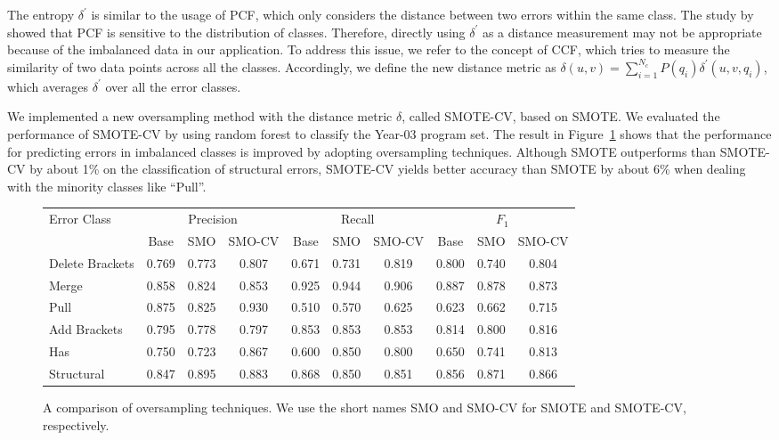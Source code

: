 \documentclass[12pt]{report}	%
\begin{document}
The entropy $\delta^{'}$
is similar to the usage of PCF, which
only considers the distance between two
errors within the same class.
The study by \cite{Mohri94anoptimal} showed that PCF is sensitive
to the distribution of classes.
Therefore, directly using $\delta^{'}$
as a distance measurement may not be appropriate
because of the imbalanced data in our application.
To address this issue, we
refer to the concept of CCF, which
tries to measure the similarity of two data points
across all the classes. Accordingly, we define
the new distance metric as
$\delta(u, v) = \sum_{i=1}^{N_{c}}P(q_{i})\delta^{'}(u, v, q_{i})$,
which averages $\delta^{'}$ over all the error classes.

We implemented a new oversampling method with the distance metric $\delta$, 
called SMOTE-CV, based on SMOTE.
We evaluated the performance of SMOTE-CV
by using random forest to classify the Year-03
program set. The result in Figure~\ref{fig:cse} 
shows that the performance for predicting
errors in imbalanced classes is improved by adopting oversampling techniques.
Although SMOTE outperforms than SMOTE-CV by about 1\% 
on the classification of structural errors,
SMOTE-CV yields better accuracy than SMOTE by about 6\%
when dealing with the minority classes like ``Pull''.

\begin{figure}
\centering
\setlength\tabcolsep{4pt}
  \begin{tabular}{  l | ccc | ccc | ccc }
\toprule
    \multirow{2}{*}{Error Class}
     & \multicolumn{3}{c|}{Precision} & \multicolumn{3}{c|}{Recall} & \multicolumn{3}{c}{$F_1$} \\
        & Base & SMO & SMO-CV &  Base & SMO & SMO-CV &  Base & SMO & SMO-CV\\ 
\midrule
    Delete Brackets & 0.769 & 0.773 & 0.807 & 0.671 & 0.731 & 0.819 & 0.800 & 0.740 & 0.804\\ 
    Merge & 0.858 & 0.824 & 0.853 & 0.925 & 0.944 & 0.906 & 0.887 & 0.878 & 0.873\\
    Pull & 0.875 & 0.825 & 0.930 & 0.510 & 0.570 & 0.625 & 0.623 & 0.662 & 0.715\\
    Add Brackets & 0.795 & 0.778 & 0.797 & 0.853 & 0.853 & 0.853 & 0.814 & 0.800 & 0.816\\
    Has \prog{\$} & 0.750 & 0.723 & 0.867 & 0.600 & 0.850 & 0.800 & 0.650 & 0.741 & 0.813 \\
    Structural & 0.847 & 0.895 & 0.883 & 0.868 & 0.850 & 0.851 & 0.856 & 0.871 & 0.866 \\
\bottomrule
  \end{tabular}
    \caption[A comparison of oversampling techniques]{A comparison of oversampling techniques. 
    We use the short names SMO and SMO-CV for SMOTE and SMOTE-CV, respectively.}
    \label{fig:cse}
\end{figure}
\end{document}
